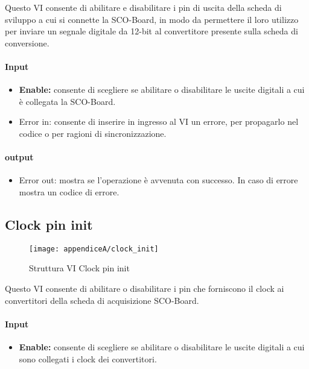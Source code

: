 Questo VI consente di abilitare e disabilitare i pin di uscita della scheda di sviluppo a cui si connette la SCO-Board, in modo da permettere il loro utilizzo per inviare un segnale digitale da 12-bit al convertitore presente sulla scheda di conversione.

\paragraph{Input}
\begin{itemize}
	\item \textbf{Enable:} consente di scegliere se abilitare o disabilitare le uscite digitali a cui è collegata la SCO-Board.
	\item Error in: consente di inserire in ingresso al VI un errore, per propagarlo nel codice o per ragioni di sincronizzazione.
\end{itemize}

\paragraph{output}
\begin{itemize}
	\item Error out: mostra se l'operazione è avvenuta con successo. In caso di errore mostra un codice di errore.
\end{itemize}

\subsection{Clock pin init}

\begin{figure}[H]
	\begin{center}
		\texttt{[image: appendiceA/clock\_init]}
		\caption{Struttura VI Clock pin init}
	\end{center}
\end{figure}

Questo VI consente di abilitare o disabilitare i pin che forniscono il clock ai convertitori della scheda di acquisizione SCO-Board.
\paragraph{Input}
\begin{itemize}
	\item \textbf{Enable:} consente di scegliere se abilitare o disabilitare le uscite digitali a cui sono collegati i clock dei convertitori.
\end{itemize}

